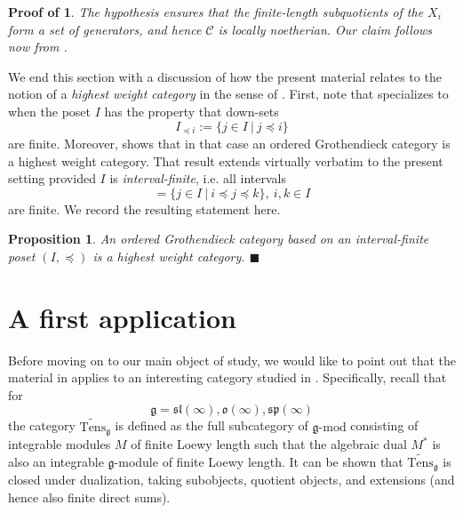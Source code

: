 \documentclass[11pt]{article}
\theoremstyle{plain}
\newtheorem{proposition}[lemma]{Proposition}
\theoremstyle{nonumberplain}
\theoremstyle{plain}
\theoremstyle{nonumberplain}
\newtheorem{proof-of-locnoe}{Proof of \Cref{pr.loc-noe}}
\newcommand\cC{\mathcal C}
\newcommand\fg{\mathfrak{g}}
\newcommand\fsl{\mathfrak{sl}}
\newcommand\fo{\mathfrak{o}}
\newcommand\fsp{\mathfrak{sp}}
\newcommand{\qedhere}{\mbox{}\hfill\ensuremath{\blacksquare}}
\begin{document}
\begin{proof-of-locnoe}
The hypothesis ensures that the finite-length subquotients of the
$X_i$ form a set of generators, and hence $\cC$ is locally noetherian. Our claim follows now from . 
\end{proof-of-locnoe}






We end this section with a discussion of how the present material
relates to the notion of a {\it highest weight category} in the sense of \cite[Definition 3.1]{CPS}. First, note that 
specializes to \cite[Definition 2.1]{us2} when the poset $I$ has the
property that down-sets
\begin{equation*}
  I_{{\preceq} i}:=\{j\in I\ |\ j{\preceq} i\}
\end{equation*}
are finite. Moreover, \cite[Proposition 2.16]{us2} shows that in that
case an ordered Grothendieck category is a highest weight category. That result extends virtually
verbatim to the present setting provided $I$ is {\it
  interval-finite}, i.e. all intervals
\begin{equation*}
  [i,k] = \{j\in I\ |\ i{\preceq j\preceq} k\},\ i,k\in I
\end{equation*}
are finite. We record the resulting statement here. 


\begin{proposition}\label{pr.hw}
  An ordered Grothendieck category based on an interval-finite poset
  $(I,{\preceq})$ is a highest weight category. \qedhere
\end{proposition}




\section{A first application}\label{se.ex}



Before moving on to our main object of study, we {would like to point out that the material in
   applies} to an interesting category studied in
\cite{PS1}. Specifically, recall that for
\begin{equation*}
  \fg=\fsl(\infty), \fo(\infty), \fsp(\infty)
\end{equation*}
the category $\widetilde{\mathrm{Tens}}_\fg$ is defined as
the full subcategory of $\fg\text{-mod}$ consisting of integrable
modules $M$ of finite Loewy length such that the algebraic dual
$M^*$ is also {an integrable
  $\fg$-module} of finite Loewy length. It can be shown that
$\widetilde{\mathrm{Tens}}_\fg$ is closed under dualization, taking
subobjects, quotient objects, and extensions (and hence also finite
direct sums).
\end{document}
